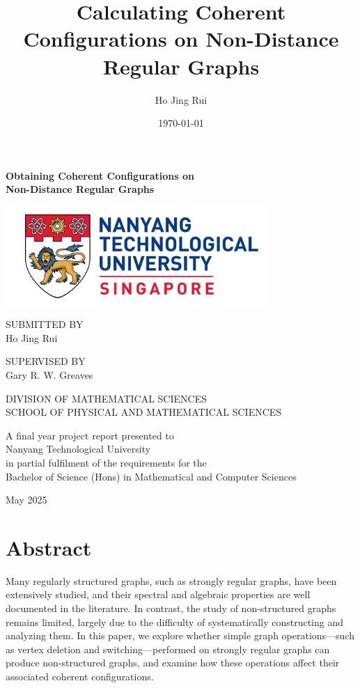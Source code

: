 \documentclass[11pt,a4paper]{article}
\title{Calculating Coherent Configurations on Non-Distance Regular Graphs}
\author{Ho Jing Rui}
\date{\today}
\theoremstyle{remark}
\begin{document}
\begin{titlepage}
    \centering
    \vspace{5.5cm}

    {\LARGE\bfseries Obtaining Coherent Configurations on \\Non-Distance Regular Graphs \par}
    \vspace{1.5cm}

    \includegraphics[width=10cm]{images/logo.png}
    \vspace{1.5cm}

    {\large SUBMITTED BY \\ Ho Jing Rui\par}
    \vspace{1cm}

    {\large SUPERVISED BY\\ Gary R. W. Greaves\par}
    \vspace{2.5cm}

    {\large DIVISION OF MATHEMATICAL SCIENCES\\
    SCHOOL OF PHYSICAL AND MATHEMATICAL SCIENCES}
    \vspace{2cm}

    A final year project report presented to \\
    Nanyang Technological University \\
    in partial fulfilment of the requirements for the \\
    Bachelor of Science (Hons) in Mathematical and Computer Sciences
    \vspace{0.5cm}

    \vfill

    \vspace{1.5cm}
    {\large May 2025 \par}
\end{titlepage}

\newpage
{}
\section*{Abstract}
Many regularly structured graphs, such as strongly regular graphs, have been extensively studied, and their spectral and algebraic properties are well documented in the literature. In contrast, the study of non-structured graphs remains limited, largely due to the difficulty of systematically constructing and analyzing them. In this paper, we explore whether simple graph operations—such as vertex deletion and switching—performed on strongly regular graphs can produce non-structured graphs, and examine how these operations affect their associated coherent configurations.
\end{document}
